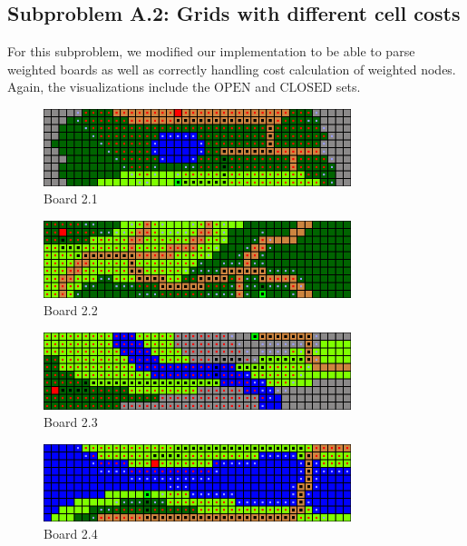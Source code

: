 \newpage


\subsection*{Subproblem A.2: Grids with different cell costs}

For this subproblem, we modified our implementation to be able to parse weighted
boards as well as correctly handling cost calculation of weighted nodes.
Again, the visualizations include the $\text{OPEN}$ and $\text{CLOSED}$ sets.

\begin{figure}[h!]
  \centering
    \includegraphics[width=0.8\textwidth]{img/board-2-1-astar}
    \caption{Board 2.1}
\end{figure}

\begin{figure}[h!]
  \centering
    \includegraphics[width=0.8\textwidth]{img/board-2-2-astar}
    \caption{Board 2.2}
\end{figure}

\begin{figure}[h!]
  \centering
    \includegraphics[width=0.8\textwidth]{img/board-2-3-astar}
    \caption{Board 2.3}
\end{figure}

\begin{figure}[h!]
  \centering
    \includegraphics[width=0.8\textwidth]{img/board-2-4-astar}
    \caption{Board 2.4}
\end{figure}

